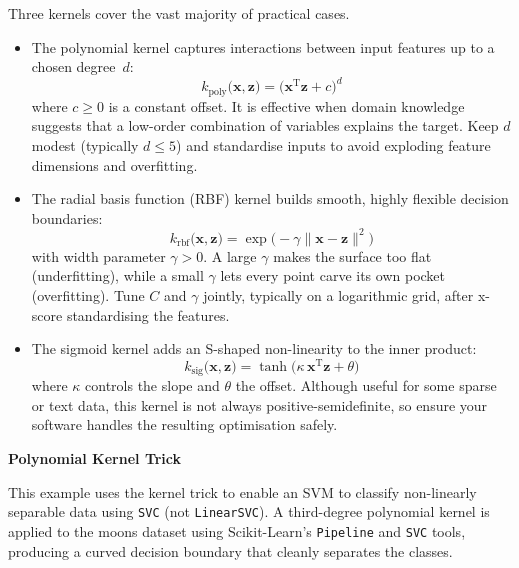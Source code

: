 \documentclass[12pt,letter]{article}
\begin{document}
Three kernels cover the vast majority of practical cases. 
\begin{itemize}
\item The polynomial kernel captures interactions between input features up to a chosen degree~$d$:
\begin{equation}
k_{\text{poly}}\bigl(\textbf{x},\textbf{z}\bigr)
  = \bigl(\textbf{x}^{\text{T}}\textbf{z} + c\bigr)^{d}
\end{equation}
where $c\!\ge\!0$ is a constant offset.  It is effective when domain knowledge suggests that a low-order combination of variables explains the target.  Keep $d$ modest (typically $d\le5$) and standardise inputs to avoid exploding feature dimensions and overfitting.
\item The radial basis function (RBF) kernel builds smooth, highly flexible decision boundaries:
\begin{equation}
k_{\text{rbf}}\bigl(\textbf{x},\textbf{z}\bigr)
  = \exp\!\bigl(-\gamma \lVert \textbf{x}-\textbf{z}\rVert^{2}\bigr)
\end{equation}
with width parameter $\gamma>0$.  A large $\gamma$ makes the surface too flat (underfitting), while a small $\gamma$ lets every point carve its own pocket (overfitting).  Tune $C$ and $\gamma$ jointly, typically on a logarithmic grid, after x-score standardising the features.
\item The sigmoid kernel adds an S-shaped non-linearity to the inner product:
\begin{equation}
k_{\text{sig}}\bigl(\textbf{x},\textbf{z}\bigr)
  = \tanh\!\bigl(\kappa\,\textbf{x}^{\text{T}}\textbf{z} + \theta\bigr)
\end{equation}
where $\kappa$ controls the slope and $\theta$ the offset.  Although useful for some sparse or text data, this kernel is not always positive-semidefinite, so ensure your software handles the resulting optimisation safely.
\end{itemize}

\pagebreak

\begin{example}
\textbf{Polynomial Kernel Trick}

\noindent This example uses the kernel trick to enable an SVM to classify non-linearly separable data using \texttt{SVC} (not \texttt{LinearSVC}). A third-degree polynomial kernel is applied to the moons dataset using Scikit-Learn's \texttt{Pipeline} and \texttt{SVC} tools, producing a curved decision boundary that cleanly separates the classes.
\end{example}
\end{document}
